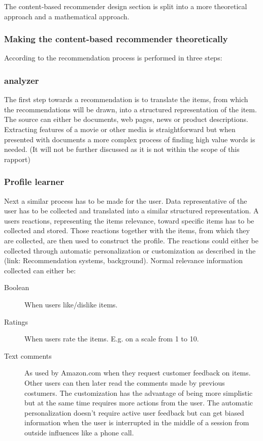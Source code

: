 The content-based recommender design section is split into a more theoretical approach and a mathematical approach.

\subsubsection{Making the content-based recommender theoretically}

According to \cite{RecSysHandbook} the recommendation process is performed in three steps:

\subsubsection{analyzer}

The first step towards a recommendation is to translate the items, from which the recommendations will be drawn, into a structured representation of the item. The source can either be documents, web pages, news or product descriptions. Extracting features of a movie or other media is straightforward but when presented with documents a more complex process of finding high value words is needed. (It will not be further discussed as it is not within the scope of this rapport)    
 
\subsubsection{Profile learner}

Next a similar process has to be made for the user. Data representative of the user has to be collected and translated into a similar structured representation. A users reactions, representing the items relevance, toward specific items has to be collected and stored. Those reactions together with the items, from which they are collected, are then used to construct the profile. The reactions could either be collected through automatic personalization or customization as described in the (link: Recommendation systems, background). Normal relevance information collected can either be:

\begin{description}
\item[Boolean] When users like/dislike items.


\item[Ratings] When users rate the items. E.g. on a scale from 1 to 10.


\item[Text comments] As used by Amazon.com when they request customer feedback on items. Other users can then later read the comments made by previous costumers. The customization has the advantage of being more simplistic but at the same time requires more actions from the user. The automatic personalization doesn't require active user feedback but can get biased information when the user is interrupted in the middle of a session from outside influences like a phone call.
\end{description}

